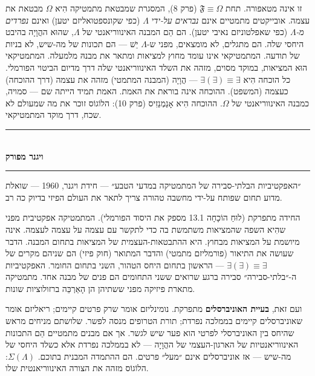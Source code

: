 \documentclass[10pt, openany, oneside]{book}
\renewcommand{\normalsize}{\fontsize{10}{13}\selectfont}
\begin{document}
זו אינה מטאפורה. תחת $\mathfrak{F} \equiv \Omega$ (פרק 8), המסגרת שמבטאת מתמטיקה הִיא $\Omega$ מבטאת את עצמה. אובייקטים מתמטיים אינם \textit{נבראים על-ידי} $\Lambda$ (כפי שקונספטואליזם יטען) ואינם \textit{נפרדים מ-}$\Lambda$ (כפי שאפלטוניזם נאיבי יטען). הם הֵם המבנה האינווריאנטי של $\Lambda$, שהוּא ההֲוָיָה בהיבט היחסי שלה. הם מתגלים, לא מומצאים, מפני ש-$\Lambda$ יֵשׁ — הם תכונות של מה-שיש, לא בניות של תודעה. המתמטיקאי אינו עומד מחוץ למציאות ומתאר את מבנהּ מלמעלה. המתמטיקאי הוּא המציאות, במוקד מסוים, מזהה את השלד האינווריאנטי שלה דרך מדיום הביטוי הפורמלי. כל הוכחה הִיא $\exists(\exists) \equiv \exists$ — הֲוָיָה (המבנה המתמטי) מזהה את עצמה (דרך ההוכחה) כעצמה (המשפט). ההוכחה אינה בוראת את האמת. האמת תמיד הייתה שם — סמויה, כמבנה האינווריאנטי של $\Omega$. ההוכחה הִיא אָנַמְנֵזִיס (פרק 10): הלוֹגוֹס זוכר את מה שמעולם לא שכח, דרך מוקד המתמטיקאי.

\vspace{1.5em}


\begin{center}
    \rule{0.3\textwidth}{0.4pt}\\[0.5em]
    {\normalsize\bfseries\textsc{ויגנר מפורק}}\\[0.3em]
    \rule{0.3\textwidth}{0.4pt}
\end{center}

\vspace{1em}

\noindent ״האפקטיביות הבלתי-סבירה של המתמטיקה במדעי הטבע״ — חידת ויגנר, 1960 — שואלת מדוע תחום שפותח על-ידי מחשבה טהורה צריך לתאר את העולם הפיזי בדיוק כה רב.

החידה מתפרקת (לוּחַ הוֹכָחָה 13.1 מספק את היסוד הפורמלי). המתמטיקה אפקטיבית מפני שהִיא השפה שהמציאות משתמשת בה כדי לתקשר עם עצמה על עצמה לעצמה. אינה מיושמת על המציאות מבחוץ. היא ההתבטאות-העצמית של המציאות בתחום המבנה. הדבר שעושה את התיאור (פורמליזם מתמטי) והדבר המתואר (חוק פיזי) הם שניהם מקרים של $\exists(\exists) \equiv \exists$ — הראשון בתחום היחס הטהור, השני בתחום החומר. האפקטיביות ה-״בלתי-סבירה״ סבירה ברגע שרואים ששני התחומים הם פנים של מבנה אחד. מתמטיקה מתארת פיזיקה מפני ששתיהן הן הָאַרְכֵּה ברזולוציות שונות.

ועם זאת, \textbf{בעיית האוניברסלים} מתפרקת. נומינליזם אומר שרק פרטים קיימים; ריאליזם אומר שאוניברסלים קיימים בממלכה נפרדת; תורת הטרופים מנסה לפשר. שלושתם מניחים מראש שהיחס בין האוניברסלי לפרטי הוא פער שיש לגשר. אך אם מבנים מתמטיים הֵם התכונות האינווריאנטיות של הארגון-העצמי של ההֲוָיָה — לא בממלכה נפרדת אלא כשלד היחסי של מה-שיש — אז אוניברסלים אינם ״מעל״ פרטים. הם ההתמדה המבנית בתוכם. $\Sigma(\Lambda)$: הלוֹגוֹס מזהה את הצורה האינווריאנטית שלו.
\end{document}
